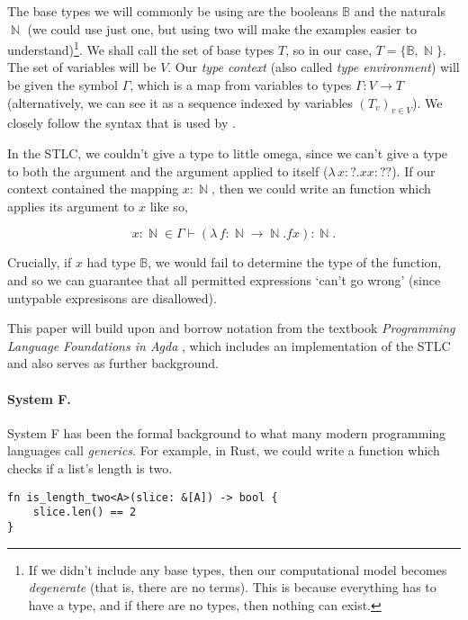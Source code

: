 \documentclass[logo,bsc,singlespacing,parskip,online]{infthesis}
\DeclareMathOperator{\nat}{\mathbb{N}}
\begin{document}
The base types we will commonly be using are the booleans $\mathbb{B}$ and the
naturals $\nat$ (we could use just one, but using two will make the examples
easier to understand)\footnote{If we didn't include any base types, then our
computational model becomes \textit{degenerate} (that is, there are no terms).
This is because everything has to have a type, and if there are no types, then
nothing can exist.}. We shall call the set of base types $T$, so in our case, $T
= \{ \mathbb{B} , \nat \}$. The set of variables will be $V$. Our \textit{type
context} (also called \textit{type environment}) will be given the symbol
$\Gamma$, which is a map from variables to types $\Gamma \colon V \to T$
(alternatively, we can see it as a sequence indexed by variables $(T_v)_{v \in
V}$). We closely follow the syntax that is used by \citet{pierce_types_2002}.

In the STLC, we couldn't give a type to little omega, since we can't give a type
to both the argument and the argument applied to itself ($\lambda \, x  \colon ?
. x x \colon ??$). If our context contained the mapping $x \colon \nat$, then we
could write an function which applies its argument to $x$ like so,

\begin{equation*}
  x \colon \nat \in \Gamma \vdash (\lambda \, f \colon \nat \to \nat . f x) \colon \nat.
\end{equation*}

Crucially, if $x$ had type $\mathbb{B}$, we would fail to determine the type of
the function, and so we can guarantee that all permitted expressions `can't go
wrong' \citep{milner_theory_1978} (since untypable expresisons are disallowed).

This paper will build upon and borrow notation from the textbook
\textit{Programming Language Foundations in Agda}
\citep{wadler_programming_2022}, which includes an implementation of the STLC
and also serves as further background.

\paragraph*{System F.} System F has been the formal background to what many
modern programming languages call \textit{generics}. For example, in Rust, we
could write a function which checks if a list's length is two.

\begin{verbatim}
fn is_length_two<A>(slice: &[A]) -> bool {
    slice.len() == 2
}
\end{verbatim}
\end{document}
